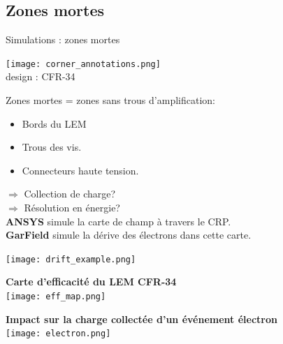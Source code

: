   \subsection{Zones mortes}
    
    \begin{frame}{Simulations : zones mortes}
    	\begin{scriptsize}
    		\begin{minipage}{0.38\textwidth}
    			\begin{center}
    				\texttt{[image: corner\_annotations.png]}\\
    				design : CFR-34\\
    			\end{center} 
    			Zones mortes = zones sans trous d'amplification:
    			\begin{itemize}
    				\item Bords du LEM
    				\item Trous des vis.
    				\item Connecteurs haute tension.
    			\end{itemize}
    			$\Rightarrow$ Collection de charge?\\
    			$\Rightarrow$ Résolution en énergie?\\
    			
    			\textbf{ANSYS} simule la carte de champ à travers le CRP.\\
    			\textbf{GarField} simule la dérive des électrons dans cette carte.\\
    		\end{minipage}
    		\begin{minipage}{0.58\textwidth}
    			\centering
    			\texttt{[image: drift\_example.png]}\\
    			\vspace{0.5cm} \hspace{0.1cm}
    			\begin{minipage}{0.48\textwidth}
    				\centering
    				\textbf{Carte d'efficacité du LEM CFR-34}\\
    				\texttt{[image: eff\_map.png]}
    			\end{minipage}\hfill
    			\begin{minipage}{0.48\textwidth}
    				\centering
    				\textbf{Impact sur la charge collectée d'un événement électron}\\
    				\texttt{[image: electron.png]}
    			\end{minipage}
    		\end{minipage}
    	\end{scriptsize} 
    \end{frame}

